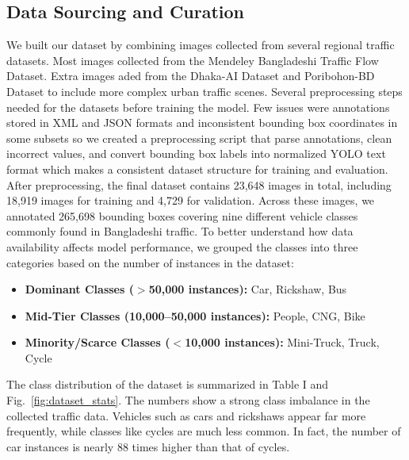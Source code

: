 \documentclass[conference]{IEEEtran}
\begin{document}
\subsection{Data Sourcing and Curation}
We built our dataset by combining images collected from several regional traffic datasets. Most images collected from the Mendeley Bangladeshi Traffic Flow Dataset\cite{Islam2025BangladeshiTrafficFlow}. Extra images aded from the Dhaka-AI Dataset\cite{DVN/POREXF_2020} and Poribohon-BD Dataset\cite{19} to include more complex urban traffic scenes. Several preprocessing steps needed for the datasets before training the model. Few issues were annotations stored in XML and JSON formats and inconsistent bounding box coordinates in some subsets so we created a preprocessing script that parse annotations, clean incorrect values, and convert bounding box labels into normalized YOLO text format which makes a consistent dataset structure for training and evaluation. After preprocessing, the final dataset contains 23,648 images in total, including 18,919 images for training and 4,729 for validation. Across these images, we annotated 265,698 bounding boxes covering nine different vehicle classes commonly found in Bangladeshi traffic. To better understand how data availability affects model performance, we grouped the classes into three categories based on the number of instances in the dataset:

\begin{itemize}
    \item \textbf{Dominant Classes ($>$50,000 instances):} Car, Rickshaw, Bus
    \item \textbf{Mid-Tier Classes (10,000--50,000 instances):} People, CNG, Bike
    \item \textbf{Minority/Scarce Classes ($<$10,000 instances):} Mini-Truck, Truck, Cycle
\end{itemize}


The class distribution of the dataset is summarized in Table I and Fig.~\ref{fig:dataset_stats}. The numbers show a strong class imbalance in the collected traffic data. Vehicles such as cars and rickshaws appear far more frequently, while classes like cycles are much less common. In fact, the number of car instances is nearly 88 times higher than that of cycles.
\end{document}
